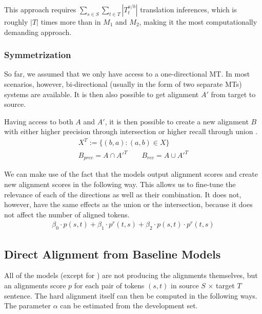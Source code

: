 This approach requires $\sum_{s\in S} \sum_{t\in T} |T_t^{a/b}|$ translation inferences, which is roughly $|T|$ times more than in $M_1$ and $M_2$, making it the most computationally demanding approach.

\subsubsection*{Symmetrization}

So far, we assumed that we only have access to a one-directional MT. In most scenarios, however, bi-directional (usually in the form of two separate MTs) systems are available. It is then also possible to get alignment $A'$ from target to source.

Having access to both $A$ and $A'$, it is then possible to create a new alignment $B$ with either higher precision through intersection or higher recall through union \citep{koehn2009statistical}.
\begin{gather*}
    X^T := \{(b, a): (a, b) \in X\} \\
    B_{prec} = A \cap A'^T \qquad B_{rec} = A \cup A'^T
\end{gather*}

We can make use of the fact that the models output alignment scores and create new alignment scores in the following way. This allows us to fine-tune the relevance of each of the directions as well as their combination. It does not, however, have the same effects as the union or the intersection, because it does not affect the number of aligned tokens.
\begin{gather*}
    \beta_0 \cdot p(s, t) + \beta_1 \cdot p^r(t, s) + \beta_2 \cdot p(s, t) \cdot p^r(t, s)
\end{gather*}

\subsection{Direct Alignment from Baseline Models}

All of the models (except for \fastalign{}) are not producing the alignments themselves, but an alignments score $p$ for each pair of tokens $(s, t)$ in source $S$ $\times$ target $T$ sentence. The hard alignment itself can then be computed in the following ways. The parameter $\alpha$ can be estimated from the development set.

